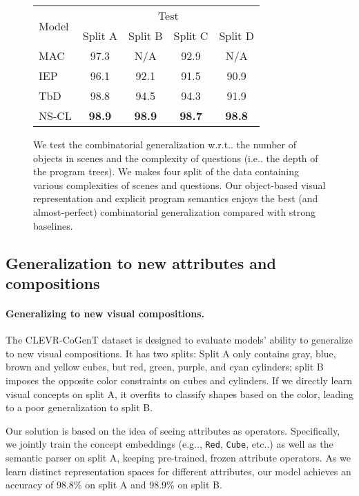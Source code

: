 \documentclass{article} \usepackage{iclr2019_conference,times}
\makeatletter
\def\vs{{\bm{s}}}
\DeclareRobustCommand\onedot{\futurelet\@let@token\@onedot}
\def\@onedot{\ifx\@let@token.\else.\null\fi\xspace}
\def\eg{e.g\onedot} \def\Eg{E.g\onedot}
\def\ie{i.e\onedot} \def\Ie{I.e\onedot}
\def\etc{etc\onedot} \def\vs{\emph{vs}\onedot}
\def\wrt{w.r.t\onedot} \def\dof{d.o.f\onedot}
\newcommand{\model}{NS-CL\xspace}
\makeatother
\begin{document}
\begin{figure*}[t]
\begin{minipage}{0.4\textwidth}
\begin{tabular}{lcccc}
\toprule
\multirow{2}{*}{Model} & \multicolumn{4}{c}{Test}\\
\cmidrule{2-5}
 & Split A & Split B & Split C & Split D \\ \midrule
MAC  & 97.3    & N/A  & 92.9 & N/A     \\
IEP  & 96.1    & 92.1 & 91.5 &   90.9    \\
TbD  & 98.8  & 94.5 & 94.3 & 91.9    \\ \midrule
\model      & \textbf{98.9}    & \textbf{98.9} & \textbf{98.7} & \textbf{98.8}    \\ \bottomrule
\end{tabular}
\caption{We test the combinatorial generalization \wrt the number of objects in scenes and the complexity of questions (\ie the depth of the program trees). We makes four split of the data containing various complexities of scenes and questions. Our object-based visual representation and explicit program semantics enjoys the best (and almost-perfect) combinatorial generalization compared with strong baselines.}
\label{tab:expr:combinatorial}
\end{minipage}

\end{figure*}

\subsection{Generalization to new attributes and compositions}
\label{sec:expr:comb}

\paragraph{Generalizing to new visual compositions.} The CLEVR-CoGenT dataset is designed to evaluate models' ability to generalize to new visual compositions. It has two splits: Split A only contains gray, blue, brown and yellow cubes, but red, green, purple, and cyan cylinders; split B imposes the opposite color constraints on cubes and cylinders. If we directly learn visual concepts on split A, it overfits to classify shapes based on the color, leading to a poor generalization to split B.

Our solution is based on the idea of seeing attributes as operators. Specifically, we jointly train the concept embeddings (\eg, \texttt{Red}, \texttt{Cube}, \etc) as well as the semantic parser on split A, keeping pre-trained, frozen attribute operators. As we learn distinct representation spaces for different attributes, our model achieves an accuracy of 98.8\% on split A and 98.9\% on split B.
\end{document}
